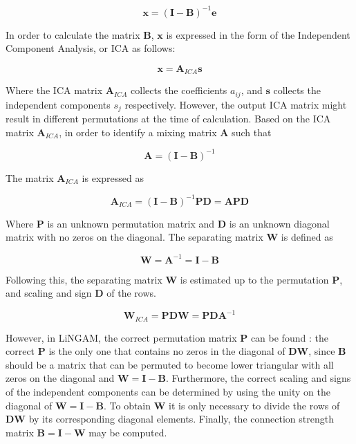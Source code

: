 \documentclass[review]{elsarticle}
\renewcommand{\vec}[1]{\mathbf{#1}}
\begin{document}
\begin{equation}\label{eq:lingam2}
\vec{x} = (\vec{I} - \vec{B})^{-1} \vec{e}
\end{equation}

In order to calculate the matrix \(\vec{B}\), \(\vec{x}\) is expressed in the form of the Independent Component Analysis, or ICA \cite[][]{jutten1991,hyvarinen2001} as follows:

\begin{equation}\label{eq:lingam3}
\vec{x} = \vec{A}_{ICA}\vec{s}
\end{equation}

Where the ICA matrix \(\vec{A}_{ICA}\) collects the coefficients \(a_{ij}\), and \(\vec{s}\) collects the independent components \(s_j\) respectively. However, the output ICA matrix might result in different permutations at the time of calculation. 
Based on the ICA matrix \(\vec{A}_{ICA}\), in order to identify a mixing matrix \(\vec{A}\) such that

\begin{equation}\label{eq:lingam4}
\vec{A} = (\vec{I} - \vec{B})^{-1}
\end{equation}

The matrix \(\vec{A}_{ICA}\) is expressed as

\begin{equation}\label{eq:lingam5}
\vec{A}_{ICA} = (\vec{I} - \vec{B})^{-1} \vec{P}\vec{D} = \vec{A}\vec{P}\vec{D}
\end{equation}

Where \(\vec{P}\) is an unknown permutation matrix and \(\vec{D}\) is an unknown diagonal matrix with no zeros on the diagonal. 
The separating matrix \(\vec{W}\) is defined as

\begin{equation}\label{eq:lingam5}
\vec{W} = \vec{A}^{-1} = \vec{I} - \vec{B}
\end{equation}

Following this, the separating matrix \(\vec{W}\) is estimated up to the permutation \(\vec{P}\), and scaling and sign \(\vec{D}\) of the rows.

\begin{equation}\label{eq:lingam6}
\vec{W}_{ICA} = \vec{P}\vec{D}\vec{W} = \vec{P}\vec{D} \vec{A}^{-1}
\end{equation}

However, in LiNGAM, the correct permutation matrix \(\vec{P}\) can be found \cite[][]{shimizu2006}: the correct \(\vec{P}\) is the only one that contains no zeros in the diagonal of \(\vec{D}\vec{W}\), since \(\vec{B}\) should be a matrix that can be permuted to become lower triangular with all zeros on the diagonal and \(\vec{W} = \vec{I} - \vec{B}\). Furthermore, the correct scaling and signs of the independent components can be determined by using the unity on the diagonal of \(\vec{W} = \vec{I} - \vec{B}\). To obtain \(\vec{W}\) it is only necessary to divide the rows of \(\vec{D}\vec{W}\) by its corresponding diagonal elements. Finally, the connection strength matrix \(\vec{B} = \vec{I} - \vec{W}\) may be computed.
\end{document}
